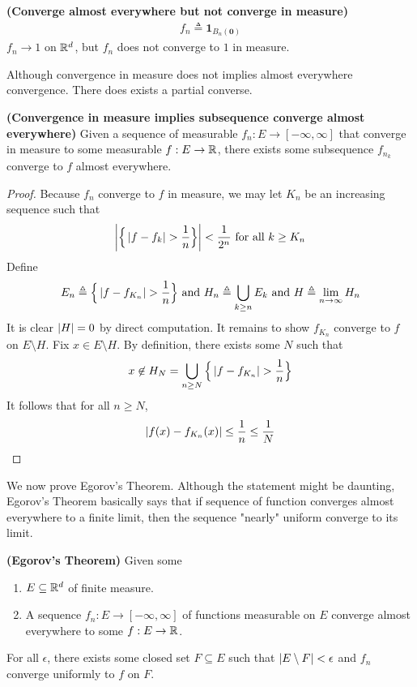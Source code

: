 \documentclass{report}
\begin{document}
\begin{Example}{\textbf{(Converge almost everywhere but not converge in measure)}}{}
\begin{align*}
f_n\triangleq \textbf{1}_{B_n(\textbf{0})}
\end{align*}
$f_n\to 1$ on $\mathbb{R}^d$, but $f_n$ does not converge to $1$ in measure.
\end{Example}
\begin{mdframed}
Although convergence in measure does not implies almost everywhere convergence. There does exists a partial converse. 
\end{mdframed}
\begin{theorem}
\textbf{(Convergence in measure implies subsequence converge almost everywhere)} Given a sequence of measurable $f_n:E\rightarrow [-\infty,\infty]$ that converge in measure to some measurable $f:E\rightarrow \mathbb{R}$, there exists some subsequence $f_{n_k}$ converge to $f$ almost everywhere.
\end{theorem}
\begin{proof}
Because $f_n$ converge to $f$ in measure, we may let  $K_n$ be an increasing sequence such that 
\begin{align*}
\abso{\bset{\abso{f-f_{k}}>\frac{1}{n}}}< \frac{1}{2^n}\text{ for all }k\geq K_n
\end{align*}
Define  
 \begin{align*}
E_n\triangleq \bset{\abso{f-f_{K_n}}> \frac{1}{n}}\text{ and }H_n \triangleq \bigcup_{k\geq n}E_k\text{ and }H\triangleq \lim_{n\to \infty}H_n
\end{align*}
It is clear $\left|H\right|=0$ by direct computation. It remains to show $f_{K_n}$ converge to $f$ on  $E \setminus H$. Fix $x\in E\setminus H$. By definition, there exists some $N$ such that 
\begin{align*}
x\not\in H_N = \bigcup_{n\geq N} \bset{\abso{f-f_{K_n} }> \frac{1}{n}}
\end{align*}
It follows that for all $n\geq N$, 
\begin{align*}
\left|f(x)-f_{K_n}(x)\right|\leq \frac{1}{n} \leq \frac{1}{N}
\end{align*}
\end{proof}
\begin{mdframed}
We now prove Egorov's Theorem. Although the statement might be daunting, Egorov's Theorem basically says that if sequence of function converges almost everywhere to a finite limit, then the sequence "nearly" uniform converge to its limit. 
\end{mdframed}
\begin{theorem}
\label{Egorov's Theorem}
\textbf{(Egorov's Theorem)} Given some 
\begin{enumerate}[label=(\alph*)]
  \item $E\subseteq \mathbb{R}^d$ of finite measure. 
  \item A sequence $f_n:E\rightarrow [-\infty,\infty]$ of functions measurable on $E$ converge almost everywhere to some  $f:E\rightarrow \mathbb{R}$. 
\end{enumerate}
For all $\epsilon $, there exists some closed set $F\subseteq E$ such that $\left|E\setminus F\right|<\epsilon $ and $f_n$ converge uniformly to  $f$ on  $F$.  
\end{theorem}
\end{document}
